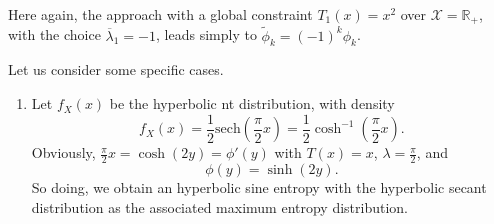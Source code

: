 \documentclass[english,onecolumn]{elsarticle}
\def\Rset{\mathbb{R}}
\def\X{\mathcal{X}}
\begin{document}
Here again,  the approach  with a global  constraint $T_1(x)  = x^2$ over  $\X =
\Rset_+$,  with  the  choice  $\overline{\lambda}_1  = -  1$,  leads  simply  to
$\widetilde{\phi}_k = (-1)^k \phi_k$.




\vspace{1cm}

\centerline{\underline{\hspace{10cm}}}

\vspace{1cm}




Let us consider some specific cases. 
\begin{enumerate}
%
\item Let $f_{X}(x)$ be the hyperbolic nt distribution, with density
\[
f_{X}(x)=\frac12\text{sech}(\frac{\pi}{2}x)=\frac12\cosh^{-1}(\frac{\pi}{2}x).
\]
Obviously, $\frac{\pi}{2}x=\cosh(2y)=\phi'(y)$ with $T(x)=x$, $\lambda=\frac{\pi}{2}$,
and 
\[
\phi(y)=\sinh(2y).
\]
So doing, we obtain an hyperbolic sine entropy with the hyperbolic
secant distribution as the associated maximum entropy distribution.
\end{enumerate}
\end{document}
